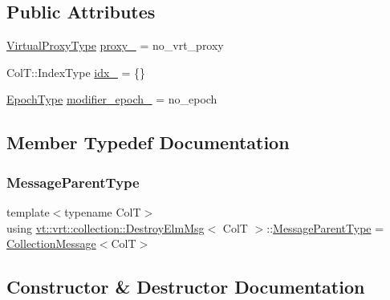 \subsection*{Public Attributes}
\begin{DoxyCompactItemize}
\item 
\hyperlink{namespacevt_a1b417dd5d684f045bb58a0ede70045ac}{Virtual\+Proxy\+Type} \hyperlink{structvt_1_1vrt_1_1collection_1_1_destroy_elm_msg_aee568f34ec7d082546ef24868870a7aa}{proxy\+\_\+} = no\+\_\+vrt\+\_\+proxy
\item 
Col\+T\+::\+Index\+Type \hyperlink{structvt_1_1vrt_1_1collection_1_1_destroy_elm_msg_a84d402cc7f4957b333ea1dd2d4dd4a1d}{idx\+\_\+} = \{\}
\item 
\hyperlink{namespacevt_a985a5adf291c34a3ca263b3378388236}{Epoch\+Type} \hyperlink{structvt_1_1vrt_1_1collection_1_1_destroy_elm_msg_a4614aa0e735c987973c4c790f2d060c2}{modifier\+\_\+epoch\+\_\+} = no\+\_\+epoch
\end{DoxyCompactItemize}


\subsection{Member Typedef Documentation}
\mbox{\label{structvt_1_1vrt_1_1collection_1_1_destroy_elm_msg_a4e24b2bce083d36d6fb448e37f40833b}} 
\subsubsection{\texorpdfstring{Message\+Parent\+Type}{MessageParentType}}
{\footnotesize\ttfamily template$<$typename ColT$>$ \\
using \hyperlink{structvt_1_1vrt_1_1collection_1_1_destroy_elm_msg}{vt\+::vrt\+::collection\+::\+Destroy\+Elm\+Msg}$<$ ColT $>$\+::\hyperlink{structvt_1_1location_1_1_entity_msg_a186637100a628eb04cb00127f5579210}{Message\+Parent\+Type} =  \hyperlink{structvt_1_1vrt_1_1collection_1_1_collection_message}{Collection\+Message}$<$ColT$>$}



\subsection{Constructor \& Destructor Documentation}
\mbox{\label{structvt_1_1vrt_1_1collection_1_1_destroy_elm_msg_a2bf33cf7e0b6327724ecab2ac97774b4}} 
